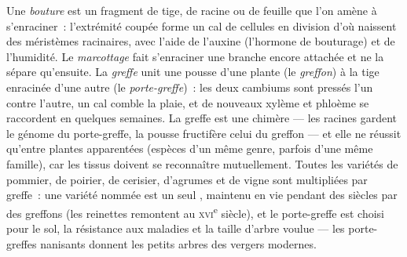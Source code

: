 \begin{proposition}\label{prop:b2:asexual-reproduction:horticulture}
Une \emph{bouture} est un fragment de tige, de racine ou de feuille que
l'on amène à s'enraciner~: l'extrémité coupée forme un cal de cellules en
division d'où naissent des méristèmes racinaires, avec l'aide de l'auxine
(l'hormone de bouturage) et de l'humidité. Le \emph{marcottage} fait
s'enraciner une branche encore attachée et ne la sépare qu'ensuite. La
\emph{greffe} unit une pousse d'une plante (le \emph{greffon}) à la tige
enracinée d'une autre (le \emph{porte-greffe})~: les deux cambiums sont
pressés l'un contre l'autre, un cal comble la plaie, et de nouveaux
xylème et phloème se raccordent en quelques semaines. La greffe est une
chimère --- les racines gardent le génome du porte-greffe, la pousse
fructifère celui du greffon --- et elle ne réussit qu'entre plantes
apparentées (espèces d'un même genre, parfois d'une même famille), car
les tissus doivent se reconnaître mutuellement. Toutes les variétés de
pommier, de poirier, de cerisier, d'agrumes et de vigne sont multipliées
par greffe~: une variété nommée est un seul , maintenu en vie
pendant des siècles par des greffons (les reinettes remontent au
\textsc{xvi}\textsuperscript{e} siècle), et le porte-greffe est choisi
pour le sol, la résistance aux maladies et la taille d'arbre voulue ---
les porte-greffes nanisants donnent les petits arbres des vergers
modernes.
\end{proposition}

